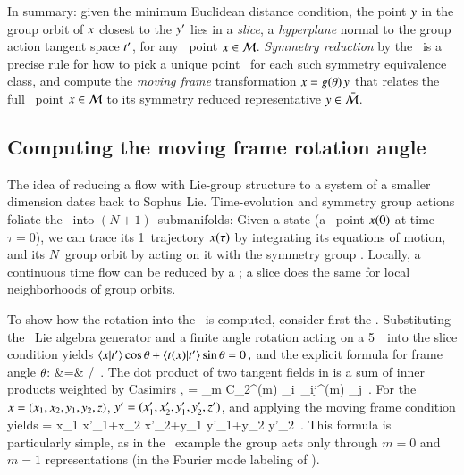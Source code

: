 \documentclass[preprint,12pt]{elsarticle} %
\begin{document}
In summary: given the minimum Euclidean distance condition, the
point $y$ in the group orbit of $x$ closest
to the {\template} ${y'}$ lies in a \emph{slice}, a {\em hyperplane}
normal to the group action tangent space $t'_{}$, for any \statesp\
point $x \in {\cal M}$. {\em Symmetry reduction} by the \mframes\ is a
precise rule for how to pick a unique point \sspRed\ for each such
symmetry equivalence class, and compute the \emph{moving frame}
transformation $x =g({\bf \theta})\, y$ that relates the full
\statesp\ point  $x \in {\cal M}$ to its symmetry reduced representative
$y \in \bar{\cal M}$.


\subsection{Computing the moving frame rotation angle}
\label{exam:CLErotAngle}

															\toCB
The idea of reducing a flow with Lie-group structure to a system of a
smaller dimension dates back to Sophus Lie.
Time-evolution and symmetry group actions foliate the \statesp\ into
$(N\!+\!1)$\dmn\ submanifolds: Given a state (a \statesp\ point $x(0)$
at time $\tau=0$), we can trace its  1\dmn\ trajectory $x(\tau)$ by
integrating its equations of motion, and its $N$\dmn\ group orbit by
acting on it with the symmetry group \Group. Locally, a continuous time
flow can be reduced by a \PoincSec; a slice does the same for local
neighborhoods of group orbits.

To show how the rotation into the \slice\ is computed, consider first the
\cLe. Substituting the \ Lie algebra
generator and a finite angle \SOn{2} rotation  acting on a
5\dmn\ \statesp\ into the slice condition \refeq{PCsectQ}
yields
\(\braket{\ssp}{\sliceTan{}}\cos\gSpace
    +\braket{\groupTan_{}(\ssp)}{\sliceTan{}} \sin\gSpace
= 0
\,,
\)
and the explicit formula for frame angle ${\bf \theta}$:
\bea
\tan\gSpace &=&
   {\braket{\ssp}{\sliceTan{}}}/
          {\braket{\groupTan_{}(\ssp)}{\sliceTan{}}}
\,.
\label{SL:CLEsliceRot}
\eea
The dot product of two tangent fields in  is a
sum of inner products weighted by Casimirs \refeq{QuadCasimir},
\beq
\braket{\groupTan(\sspRed)}{\groupTan(\slicep)}
   = \sum_m C_2^{(m)} {\sspRed}_i\, \delta_{ij}^{(m)} \slicep_j
\,.
For the \cLe\
$x = (x_1,x_2,y_1,y_2,z)$,
${y'} = (x_1',x_2',y_1',y_2',z')$,
and applying the moving frame condition  yields
\beq
\tan\gSpace =
       {x_1 x'_1+x_2 x'_2+y_1 y'_1+y_2 y'_2}
\,.
This formula is particularly simple, as in the \cLe\
example the group acts only through $m=0$ and $m=1$ representations
(in the Fourier mode labeling of ).
\end{document}
